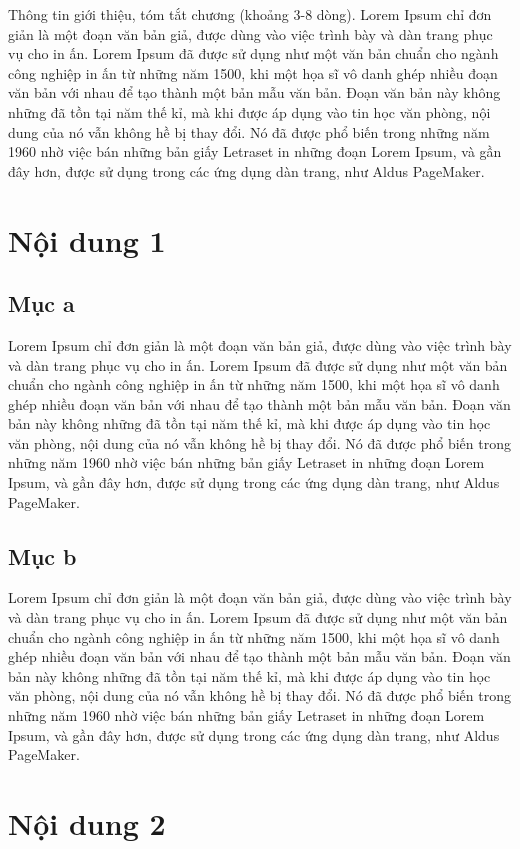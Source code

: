 Thông tin giới thiệu, tóm tắt chương (khoảng 3-8 dòng). Lorem Ipsum chỉ đơn giản là một đoạn văn bản giả, được dùng vào việc trình bày và dàn trang phục vụ cho in ấn. Lorem Ipsum đã được sử dụng như một văn bản chuẩn cho ngành công nghiệp in ấn từ những năm 1500, khi một họa sĩ vô danh ghép nhiều đoạn văn bản với nhau để tạo thành một bản mẫu văn bản. Đoạn văn bản này không những đã tồn tại năm thế kỉ, mà khi được áp dụng vào tin học văn phòng, nội dung của nó vẫn không hề bị thay đổi. Nó đã được phổ biến trong những năm 1960 nhờ việc bán những bản giấy Letraset in những đoạn Lorem Ipsum, và gần đây hơn, được sử dụng trong các ứng dụng dàn trang, như Aldus PageMaker.

\section{Nội dung 1}
\subsection{Mục a}
Lorem Ipsum chỉ đơn giản là một đoạn văn bản giả, được dùng vào việc trình bày và dàn trang phục vụ cho in ấn. Lorem Ipsum đã được sử dụng như một văn bản chuẩn cho ngành công nghiệp in ấn từ những năm 1500, khi một họa sĩ vô danh ghép nhiều đoạn văn bản với nhau để tạo thành một bản mẫu văn bản. Đoạn văn bản này không những đã tồn tại năm thế kỉ, mà khi được áp dụng vào tin học văn phòng, nội dung của nó vẫn không hề bị thay đổi. Nó đã được phổ biến trong những năm 1960 nhờ việc bán những bản giấy Letraset in những đoạn Lorem Ipsum, và gần đây hơn, được sử dụng trong các ứng dụng dàn trang, như Aldus PageMaker.

\subsection{Mục b}
Lorem Ipsum chỉ đơn giản là một đoạn văn bản giả, được dùng vào việc trình bày và dàn trang phục vụ cho in ấn. Lorem Ipsum đã được sử dụng như một văn bản chuẩn cho ngành công nghiệp in ấn từ những năm 1500, khi một họa sĩ vô danh ghép nhiều đoạn văn bản với nhau để tạo thành một bản mẫu văn bản. Đoạn văn bản này không những đã tồn tại năm thế kỉ, mà khi được áp dụng vào tin học văn phòng, nội dung của nó vẫn không hề bị thay đổi. Nó đã được phổ biến trong những năm 1960 nhờ việc bán những bản giấy Letraset in những đoạn Lorem Ipsum, và gần đây hơn, được sử dụng trong các ứng dụng dàn trang, như Aldus PageMaker.


\section{Nội dung 2}
